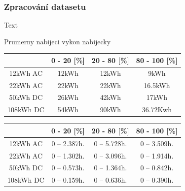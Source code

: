 \documentclass[a4paper,11pt]{article}
\begin{document}

\subsubsection{Zpracování datasetu}
Text


Prumerny nabijeci vykon nabijecky
\smallskip

\begin{center}
    \vspace{0.5cm} %
    \begin{tabular}{|c|c|c|c|}
        \hline
        \textbf{} & \textbf{0 - 20 [\%]} & \textbf{20 - 80 [\%]} & \textbf{80 - 100 [\%]}\\
        \hline
        12kWh AC  &  12kWh  & 12kWh & 9kWh  \\
        \hline
        22kWh AC  &  22kWh  & 22kWh & 16.5kWh  \\
        \hline
        50kWh DC  &  26kWh  & 42kWh & 17kWh    \\
        \hline
        108kWh DC &  54kWh  & 90kWh & 36.72Kwh \\
        \hline
    \end{tabular}
    \vspace{0.5cm} %
\end{center}

\begin{center}
    \vspace{0.5cm} %
    \begin{tabular}{|c|c|c|c|}
        \hline
        \textbf{} & \textbf{0 - 20 [\%]} & \textbf{20 - 80 [\%]} & \textbf{80 - 100 [\%]}\\
        \hline
        12kWh AC  &  0 -- 2.387h.  & 0 -- 5.728h. & 0 -- 3.509h.  \\
        \hline
        22kWh AC  &  0 -- 1.302h.  & 0 -- 3.096h. & 0 -- 1.914h.  \\
        \hline
        50kWh DC  &  0 -- 0.573h.  & 0 -- 1.364h. & 0 -- 0.842h.  \\
        \hline
        108kWh DC &  0 -- 0.159h.  & 0 -- 0.636h. & 0 -- 0.390h.  \\
        \hline
    \end{tabular}
    \vspace{0.5cm} %
\end{center}


\newpage

      
\end{document}
